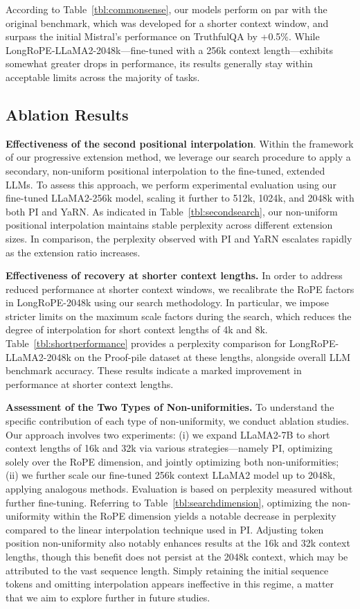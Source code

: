 According to Table~\ref{tbl:commonsense}, our models perform on par with the original benchmark, which was developed for a shorter context window, and surpass the initial Mistral's performance on TruthfulQA by +0.5\%. While LongRoPE-LLaMA2-2048k—fine-tuned with a 256k context length—exhibits somewhat greater drops in performance, its results generally stay within acceptable limits across the majority of tasks.

\subsection{Ablation Results}

\textbf{Effectiveness of the second positional interpolation}. Within the framework of our progressive extension method, we leverage our search procedure to apply a secondary, non-uniform positional interpolation to the fine-tuned, extended LLMs. To assess this approach, we perform experimental evaluation using our fine-tuned LLaMA2-256k model, scaling it further to 512k, 1024k, and 2048k with both PI and YaRN. As indicated in Table~\ref{tbl:secondsearch}, our non-uniform positional interpolation maintains stable perplexity across different extension sizes. In comparison, the perplexity observed with PI and YaRN escalates rapidly as the extension ratio increases.

\textbf{Effectiveness of recovery at shorter context lengths.} In order to address reduced performance at shorter context windows, we recalibrate the RoPE factors in LongRoPE-2048k using our search methodology. In particular, we impose stricter limits on the maximum scale factors during the search, which reduces the degree of interpolation for short context lengths of 4k and 8k. Table~\ref{tbl:shortperformance} provides a perplexity comparison for LongRoPE-LLaMA2-2048k on the Proof-pile dataset at these lengths, alongside overall LLM benchmark accuracy. These results indicate a marked improvement in performance at shorter context lengths.

\textbf{Assessment of the Two Types of Non-uniformities.} To understand the specific contribution of each type of non-uniformity, we conduct ablation studies. Our approach involves two experiments: (i) we expand LLaMA2-7B to short context lengths of 16k and 32k via various strategies—namely PI, optimizing solely over the RoPE dimension, and jointly optimizing both non-uniformities; (ii) we further scale our fine-tuned 256k context LLaMA2 model up to 2048k, applying analogous methods. Evaluation is based on perplexity measured without further fine-tuning. Referring to Table~\ref{tbl:searchdimension}, optimizing the non-uniformity within the RoPE dimension yields a notable decrease in perplexity compared to the linear interpolation technique used in PI. Adjusting token position non-uniformity also notably enhances results at the 16k and 32k context lengths, though this benefit does not persist at the 2048k context, which may be attributed to the vast sequence length. Simply retaining the initial sequence tokens and omitting interpolation appears ineffective in this regime, a matter that we aim to explore further in future studies.

